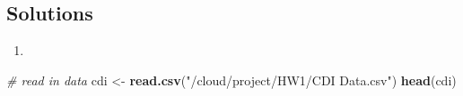 \documentclass[
]{article}
\newenvironment{Shaded}{\begin{snugshade}}{\end{snugshade}}
\newcommand{\CommentTok}[1]{\textcolor[rgb]{0.56,0.35,0.01}{\textit{#1}}}
\newcommand{\KeywordTok}[1]{\textcolor[rgb]{0.13,0.29,0.53}{\textbf{#1}}}
\newcommand{\NormalTok}[1]{#1}
\newcommand{\StringTok}[1]{\textcolor[rgb]{0.31,0.60,0.02}{#1}}
\begin{document}
\hypertarget{solutions-2}{%
\subsection{Solutions}\label{solutions-2}}

\begin{enumerate}
\def\labelenumi{\alph{enumi})}
\item
\end{enumerate}

\begin{Shaded}
\begin{Highlighting}[]
\CommentTok{# read in data}
\NormalTok{cdi <-}\StringTok{ }\KeywordTok{read.csv}\NormalTok{(}\StringTok{"/cloud/project/HW1/CDI Data.csv"}\NormalTok{)}
\KeywordTok{head}\NormalTok{(cdi)}
\end{Highlighting}
\end{Shaded}
\end{document}
